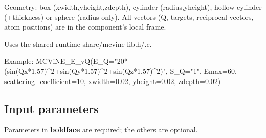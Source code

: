Geometry: box (xwidth,yheight,zdepth), cylinder (radius,yheight), hollow cylinder (+thickness) or sphere (radius only). All vectors (Q, targets, reciprocal vectors, atom positions) are in the component's local frame.

Uses the shared runtime share/mcvine-lib.h/.c.

Example: MCViNE\_E\_vQ(E\_Q="20*(sin(Qx*1.57)\textasciicircum{}2+sin(Qy*1.57)\textasciicircum{}2+sin(Qz*1.57)\textasciicircum{}2)", S\_Q="1", Emax=60, scattering\_coefficient=10, xwidth=0.02, yheight=0.02, zdepth=0.02)

\subsection*{Input parameters}
Parameters in \textbf{boldface} are required; the others are optional.

